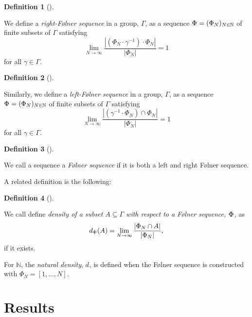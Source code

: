 \documentclass[
  british,
]{article}
\theoremstyle{definition}
\newtheorem{definition}{Definition}[section]
\theoremstyle{plain}
\theoremstyle{remark}
\newcommand{\Folner}[1][\vphantom{}]{{\Phi}_{#1}}
\newcommand{\Density}[1][\Folner]{{d}_{#1}}
\newcommand{\N}{\mathbb{N}}
\newcommand{\GroupOperation}[2]{{#1}\cdot{#2}}
\newcommand{\Group}{{\Gamma}}
\newcommand{\Inverse}[1]{{#1}^{-1}}
\newcommand{\GroupElement}{{\gamma}}
\begin{document}
\begin{definition}[]\protect\hypertarget{def-rightFolner}{}\label{def-rightFolner}

We define a \emph{right-Følner sequence} in a group, \(\Group\), as a
sequence \(\Folner =(\Folner[N])_{N\in\mathbb{N}}\) of finite subsets of
\(\Gamma\) satisfying
\[\lim_{N\rightarrow\infty}\frac{|\GroupOperation{(\GroupOperation{\Folner[N]}{\Inverse{\GroupElement}})}{\Folner[N]}|}{|\Folner[N]|}=1\]for
all \(\GroupElement\in\Group\).

\end{definition}

\begin{definition}[]\protect\hypertarget{def-leftFolner}{}\label{def-leftFolner}

Similarly, we define a \emph{left-Følner sequence} in a group,
\(\Group\), as a sequence \(\Folner =(\Folner[N])_{N\in\mathbb{N}}\) of
finite subsets of \(\Gamma\) satisfying
\[\lim_{N\rightarrow\infty}\frac{|(\Inverse{\GroupElement}\cdot\Folner[N])\cap\Folner[N]|}{|\Folner[N]|}=1 \]for
all \(\GroupElement\in\Group\).

\end{definition}

\begin{definition}[]\protect\hypertarget{def-Folner}{}\label{def-Folner}

We call a sequence a \emph{Følner sequence} if it is both a left and
right Følner sequence.

\end{definition}

A related definition is the following:

\begin{definition}[]\protect\hypertarget{def-Density}{}\label{def-Density}

We call define \emph{density of a subset \(A\subseteq\Group\) with
respect to a Følner sequence, \(\Folner\),} as
\[\Density(A)=\lim_{N\rightarrow\infty}\frac{|\Folner[N]\cap A|}{|\Folner[N]|},\]
if it exists.

\end{definition}

For \(\N\), the \emph{natural density}, \(\Density[]\), is defined when
the Følner sequence is constructed with \(\Folner[N]=[1,...,N]\).

\section{Results}\label{results}
\end{document}
